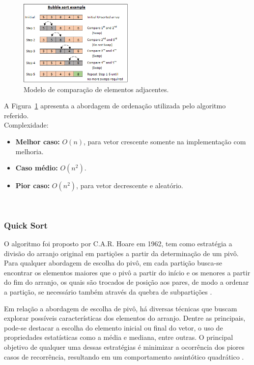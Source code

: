 \documentclass[conference,onecolumn]{IEEEtran}
\begin{document}
\begin{figure}[H]

  \centering
    \includegraphics[width=0.5\textwidth]{images/bubble.png}
    \caption{Modelo de comparação de elementos adjacentes.}        		   \label{image:modelo}
\end{figure}

A Figura~\ref{image:modelo} apresenta a abordagem de ordenação utilizada pelo algoritmo referido.\\

Complexidade:
\begin{itemize}
\item \textbf{Melhor caso:} $O (n)$, para vetor crescente somente na implementação com melhoria.
\item \textbf{Caso médio:} $O (n^2)$.
\item \textbf{Pior caso:} $O (n^2)$, para vetor decrescente e aleatório.
\end{itemize}

~\\
\subsubsection{Quick Sort}

O algoritmo foi proposto por C.A.R. Hoare em 1962, tem como estratégia a divisão do arranjo original em partições a partir da determinação de um pivô. Para qualquer abordagem de escolha do pivô, em cada partição busca-se encontrar os elementos maiores que o pivô a partir do início e os menores a partir do fim do arranjo, os quais são trocados de posição aos pares, de modo a ordenar a partição, se necessário também através da quebra de subpartições \cite{ziviani}.

Em relação a abordagem de escolha de pivô, há diversas técnicas que buscam explorar possíveis características dos elementos do arranjo. Dentre as principais, pode-se destacar a escolha do elemento inicial ou final do vetor, o uso de propriedades estatísticas como a média e mediana, entre outras. O principal objetivo de qualquer uma dessas estratégias é minimizar a ocorrência dos piores casos de recorrência, resultando em um comportamento assintótico quadrático \cite{ziviani}.
\end{document}
